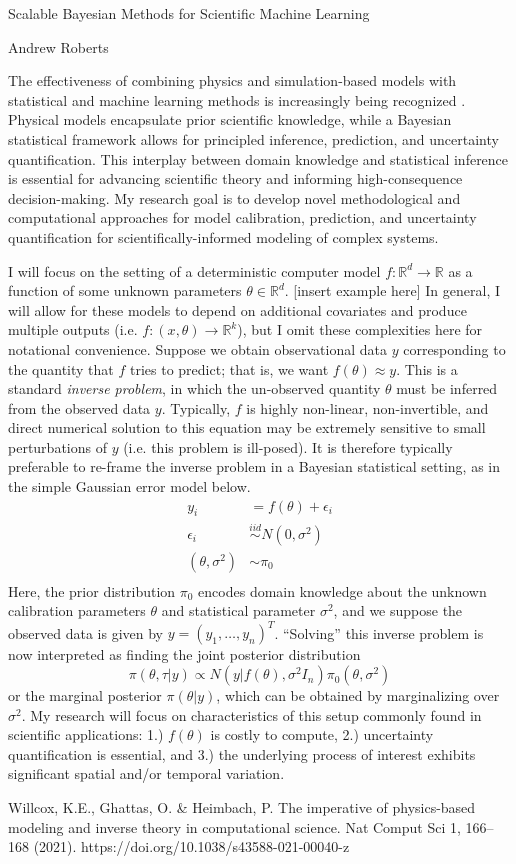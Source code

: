 \documentclass[12pt]{article}
\newcommand{\R}{\mathcal{R}}
\def\R{\mathbb{R}}
\begin{document}
\begin{center}
Scalable Bayesian Methods for Scientific Machine Learning
\end{center}

\begin{flushright}
Andrew Roberts
\end{flushright} 

The effectiveness of combining physics and simulation-based models with statistical and machine learning methods is increasingly being recognized \cite{Willcox}. Physical models
encapsulate prior scientific knowledge, while a Bayesian statistical framework allows for principled inference, prediction, and uncertainty quantification. This interplay between domain 
knowledge and statistical inference is essential for advancing scientific theory and informing high-consequence decision-making. My research goal is to develop novel methodological 
and computational approaches for model calibration, prediction, and uncertainty quantification for scientifically-informed modeling of complex systems. 

I will focus on the setting of a deterministic computer model $f: \R^d \to \R$ as a function of some unknown parameters $\theta \in \R^d$. [insert example here] In general, I will allow
for these models to depend on additional covariates and produce multiple outputs (i.e. $f: (x, \theta) \to \R^k$), but I omit these complexities here for notational convenience. Suppose 
we obtain observational data $y$ corresponding to the quantity that $f$ tries to predict; that is, we want $f(\theta) \approx y$. This is a standard \textit{inverse problem}, in which
the un-observed quantity $\theta$ must be inferred from the observed data $y$. Typically, $f$ is highly non-linear, non-invertible, and direct numerical solution to this equation may be extremely sensitive
to small perturbations of $y$ (i.e. this problem is ill-posed). It is therefore typically preferable to re-frame the inverse problem in a Bayesian statistical setting, as in the simple Gaussian error model below. 
\begin{align*}
y_i &= f(\theta) + \epsilon_i \\
\epsilon_i &\overset{iid}{\sim} N(0, \sigma^2) \\
(\theta, \sigma^2) &\sim \pi_0 \\
\end{align*}
Here, the prior distribution $\pi_0$ encodes domain knowledge about the unknown calibration parameters $\theta$ and statistical parameter $\sigma^2$, and we suppose the observed data is given by 
$y = (y_1, \dots, y_n)^T$. ``Solving'' this inverse problem is now interpreted as finding the joint posterior distribution
\[\pi(\theta, \tau|y) \propto N(y|f(\theta), \sigma^2 I_n)\pi_0(\theta, \sigma^2)\]
or the marginal posterior $\pi(\theta|y)$, which can be obtained by marginalizing over $\sigma^2$. My research will focus on characteristics of this setup commonly found in scientific applications: 1.) $f(\theta)$ is
costly to compute, 2.) uncertainty quantification is essential, and 3.) the underlying process of interest exhibits significant spatial and/or temporal variation. 



\begin{thebibliography}{20}
 Willcox, K.E., Ghattas, O. \& Heimbach, P. The imperative of physics-based modeling and inverse theory in computational science. Nat Comput Sci 1, 166–168 (2021). https://doi.org/10.1038/s43588-021-00040-z
\end{thebibliography}
\end{document}
